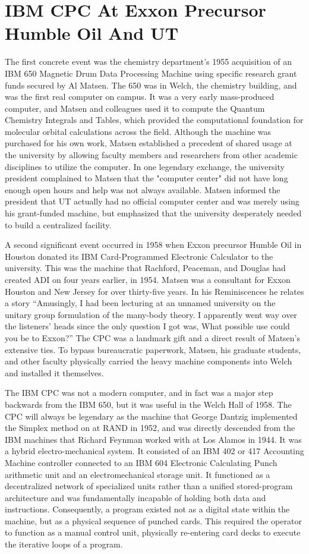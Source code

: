 \section{IBM CPC At Exxon Precursor Humble Oil And UT}

The first concrete event was the chemistry department’s 1955 acquisition of an IBM 650 Magnetic Drum Data Processing Machine using specific research grant funds secured by Al Matsen. The 650 was in Welch, the chemistry building, and was the first real computer on campus. It was a very early mass-produced computer, and Matsen and colleagues used it to compute the Quantum Chemistry Integrals and Tables, which provided the computational foundation for molecular orbital calculations across the field. Although the machine was purchased for his own work, Matsen established a precedent of shared usage at the university by allowing faculty members and researchers from other academic disciplines to utilize the computer. In one legendary exchange, the university president complained to Matsen that the "computer center" did not have long enough open hours and help was not always available. Matsen informed the president that UT actually had no official computer center and was merely using his grant-funded machine, but emphasized that the university desperately needed to build a centralized facility.

A second significant event occurred in 1958 when Exxon precursor Humble Oil in Houston donated its IBM Card-Programmed Electronic Calculator to the university. This was the machine that Rachford, Peaceman, and Douglas had created ADI on four years earlier, in 1954. Matsen was a consultant for Exxon Houston and New Jersey for over thirty-five years. In his Reminiscences he relates a story “Amusingly, I had been lecturing at an unnamed university on the unitary group formulation of the many-body theory. I apparently went way over the listeners' heads since the only question I got was, What possible use could you be to Exxon?” The CPC was a landmark gift and a direct result of Matsen’s extensive ties. To bypass bureaucratic paperwork, Matsen, his graduate students, and other faculty physically carried the heavy machine components into Welch and installed it themselves.

The IBM CPC was not a modern computer, and in fact was a major step backwards from the IBM 650, but it was useful in the Welch Hall of 1958. The CPC will always be legendary as the machine that George Dantzig implemented the Simplex method on at RAND in 1952, and was directly descended from the IBM machines that Richard Feynman worked with at Los Alamos in 1944. It was a hybrid electro-mechanical system. It consisted of an IBM 402 or 417 Accounting Machine controller connected to an IBM 604 Electronic Calculating Punch arithmetic unit and an electromechanical storage unit. It functioned as a decentralized network of specialized units rather than a unified stored-program architecture and was fundamentally incapable of holding both data and instructions. Consequently, a program existed not as a digital state within the machine, but as a physical sequence of punched cards. This required the operator to function as a manual control unit, physically re-entering card decks to execute the iterative loops of a program.

